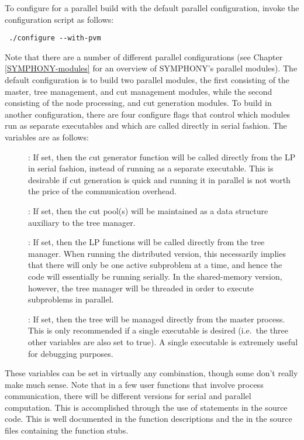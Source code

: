 
To configure for a parallel build with the default parallel configuration,
invoke the configuration script as follows: {\color{Brown}
\begin{verbatim}
 ./configure --with-pvm
\end{verbatim}
} 
Note that there are a number of different parallel configurations (see
Chapter \ref{SYMPHONY-modules} for an overview of SYMPHONY's parallel
modules). The default configuration is to build two parallel modules, the
first consisting of the master, tree management, and cut management modules,
while the second consisting of the node processing, and cut generation
modules. To build in another configuration, there are four configure flags
that control which modules run as separate executables and which are called
directly in serial fashion. The variables are as follows:
\begin{description}
        \item[] : If set, then the cut generator function will
        be called directly from the LP in serial fashion, instead of running
        as a separate executable. This is desirable if cut generation is quick
        and running it in parallel is not worth the price of the communication
        overhead.
        \item[] : If set, then the cut pool(s) will be
        maintained as a data structure auxiliary to the tree manager.
        \item[] : If set, then the LP functions will be called
        directly from the tree manager. When running the distributed version,
        this necessarily implies that there will only be one active subproblem
        at a time, and hence the code will essentially be running serially. In
        the shared-memory version, however, the tree manager will be threaded
        in order to execute subproblems in parallel.
        \item[] : If set, then the tree will be managed
        directly from the master process. This is only recommended if a single
        executable is desired (i.e.~the three other variables are also set to
        true). A single executable is extremely useful for debugging purposes.
\end{description}
These variables can be set in virtually any combination, though some
don't really make much sense. Note that in a few user functions that
involve process communication, there will be different versions for
serial and parallel computation. This is accomplished through the use
of  statements in the source code. This is well documented
in the function descriptions and the in the source files containing
the function stubs.

